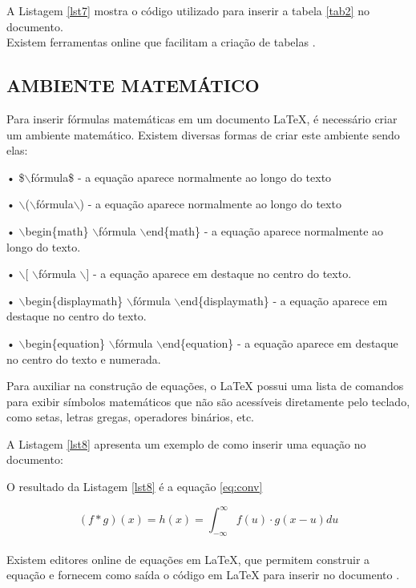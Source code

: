 \newpage
A Listagem \ref{lst7} mostra o código utilizado para inserir a tabela \ref{tab2} no documento.\\



Existem ferramentas online que facilitam a criação de tabelas \cite{tables2018} .

\subsection{AMBIENTE MATEMÁTICO}
Para inserir fórmulas matemáticas em um documento LaTeX, é necessário criar um ambiente matemático. Existem diversas formas de criar este ambiente sendo elas:

•	\$$\backslash$fórmula\$ - a equação aparece normalmente ao longo do texto

•	$\backslash$($\backslash$fórmula$\backslash$) - a equação aparece normalmente ao longo do texto

•	$\backslash$begin\{math\} $\backslash$fórmula $\backslash$end\{math\} - a equação aparece normalmente ao longo do texto.

•	$\backslash$[ $\backslash$fórmula $\backslash$] - a equação aparece em destaque no centro do texto.

•	$\backslash$begin\{displaymath\} $\backslash$fórmula $\backslash$end\{displaymath\} - a equação aparece em destaque no centro do texto.

•	$\backslash$begin\{equation\} $\backslash$fórmula $\backslash$end\{equation\} - a equação aparece em destaque no centro do texto e numerada.

Para auxiliar na construção de equações, o LaTeX possui uma lista de comandos para exibir símbolos matemáticos que não são acessíveis diretamente pelo teclado, como setas, letras gregas, operadores binários, etc.

A Listagem \ref{lst8} apresenta um exemplo de como inserir uma equação no documento:



O resultado da Listagem \ref{lst8} é a equação \ref{eq:conv}

\begin{equation} \label{eq:conv}
	(f \ast g)(x) = h(x) = \int_{-\infty }^{\infty }f(u)\cdot g(x - u)du 
\end{equation}
 \\
Existem editores online de equações em LaTeX, que permitem construir a equação e fornecem como saída o código em LaTeX para inserir no documento \cite{CodeCogs2018}.

